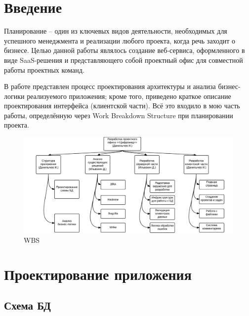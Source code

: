 \documentclass[a4paper, 14pt]{extarticle}
\begin{document}

\newpage


\tableofcontents
\newpage


\section{Введение}
Планирование -- один из ключевых видов деятельности, необходимых для успешного менеджмента и реализации любого проекта, когда речь заходит о бизнесе. Целью данной работы являлось создание веб-сервиса, оформленного в виде SaaS-решения и представляющего собой проектный офис для совместной работы проектных команд.

В работе представлен процесс проектирования архитектуры и анализа бизнес-логики реализуемого приложения; кроме того, приведено краткое описание проектирования интерфейса (клиентской части). Всё это входило в мою часть работы, определённую через Work Breakdown Structure при планировании проекта.


\begin{figure}[!htb]
  \centering
    \includegraphics[scale=0.25]{../shared_images/wbs.png}
   \caption{WBS}
    \label{fig:start}
\end{figure}

\newpage

\section{Проектирование приложения}
\subsection{Схема БД}
\end{document}
